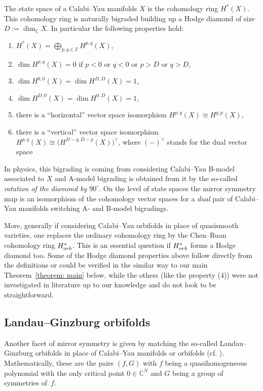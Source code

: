 \documentclass[10pt,a4paper]{article}
\numberwithin{equation}{section}
\newcommand{\CC}{{\mathbb{C}}}
\newcommand{\ZZ}{{\mathbb{Z}}}
\begin{document}
The state space of a Calabi--Yau manifolds $X$ is the cohomology ring $H^\ast(X)$.
This cohomology ring is naturally bigraded building up a Hodge diamond of size $D := \dim_\CC X$. In particular the following properties hold:
\begin{enumerate}\itemsep=0pt
 \item[(1)] $H^\ast(X) = \bigoplus_{p,q \in \ZZ} H^{p,q}(X)$,
 \item[(2)] $\dim H^{p,q}(X) = 0$ if $p <0$ or $q <0$ or $p > D$ or $q > D$,
 \item[(3)] $\dim H^{0,0}(X) = \dim H^{D,D}(X) = 1$,
 \item[(4)] $\dim H^{D,0}(X) = \dim H^{0,D}(X) = 1$,
 \item[(5)] there is a ``horizontal'' vector space isomorphism $H^{p,q}(X) \cong H^{q,p}(X)$,
 \item[(6)] there is a ``vertical'' vector space isomorphism $H^{p,q}(X) \cong \bigl(H^{D-q,D-p}(X)\bigr)^\vee$, where $(-)^\vee$ stands for the dual vector space
\end{enumerate}

In physics, this bigrading is coming from considering Calabi--Yau B-model associated to $X$ and A-model bigrading is obtained from it by the so-called {\itshape rotation of the diamond by $90^\circ$}.
On the level of state spaces the mirror symmetry map is an isomorphism of the cohomology vector spaces for a {\itshape dual} pair of Calabi--Yau manifolds switching A- and B-model bigradings.

More, generally if considering Calabi--Yau orbifolds in place of quasismooth varieties, one replaces the ordinary cohomology ring by the Chen--Ruan cohomology ring $H^\ast_{\rm orb}$.
This is an essential question if $H^\ast_{\rm orb}$ forms a Hodge diamond too. Some of the Hodge diamond properties above follow directly from the definitions or could be verified in the similar way to our main Theorem~\ref{theorem: main} below, while the others (like the property (4)) were not investigated in literature up to our knowledge and do not look to be straightforward.

\subsection{Landau--Ginzburg orbifolds}
Another facet of mirror symmetry is given by matching the so-called Landau--Ginzburg orbifolds in place of Calabi--Yau manifolds or orbifolds (cf. \cite{IV90,Kreu94,S20,V89,W93}). Mathematically, these are the pairs $(f,G)$ with $f$ being a quasihomogeneous polynomial with the only critical point $0 \in \CC^N$ and $G$ being a group of symmetries of~$f$.
\end{document}
